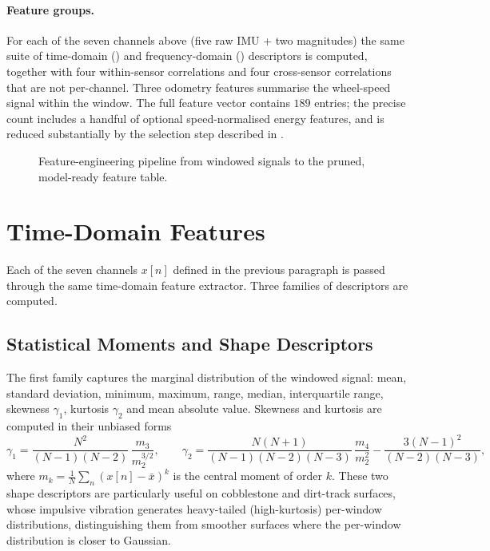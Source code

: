 \paragraph{Feature groups.}
For each of the seven channels above (five raw IMU + two magnitudes) the same suite of time-domain () and frequency-domain () descriptors is computed, together with four within-sensor correlations and four cross-sensor correlations that are not per-channel. Three odometry features summarise the wheel-speed signal within the window. The full feature vector contains $189$ entries; the precise count includes a handful of optional speed-normalised energy features, and is reduced substantially by the selection step described in .

\begin{figure}[H]
    \centering
    \caption{Feature-engineering pipeline from windowed signals to the
    pruned, model-ready feature table.}
    \label{fig:feature_pipeline}
\end{figure}

\section{Time-Domain Features}
\label{sec:feat_time}

Each of the seven channels $x[n]$ defined in the previous paragraph is passed through the same time-domain feature extractor. Three families of descriptors are computed.

\subsection{Statistical Moments and Shape Descriptors}

The first family captures the marginal distribution of the windowed signal: mean, standard deviation, minimum, maximum, range, median, interquartile range, skewness $\gamma_1$, kurtosis $\gamma_2$ and mean absolute value. Skewness and kurtosis are computed in their unbiased forms
\begin{equation}
    \gamma_1 = \frac{N^{2}}{(N-1)(N-2)}\,\frac{m_3}{m_2^{3/2}},
    \qquad
    \gamma_2 = \frac{N(N+1)}{(N-1)(N-2)(N-3)}\,\frac{m_4}{m_2^{2}} - \frac{3(N-1)^{2}}{(N-2)(N-3)},
    \label{eq:skew_kurt}
\end{equation}
where $m_k = \tfrac{1}{N}\sum_n (x[n]-\bar x)^{k}$ is the central moment of order $k$. These two shape descriptors are particularly useful on cobblestone and dirt-track surfaces, whose impulsive vibration generates heavy-tailed (high-kurtosis) per-window distributions, distinguishing them from smoother surfaces where the per-window distribution is closer to Gaussian.

